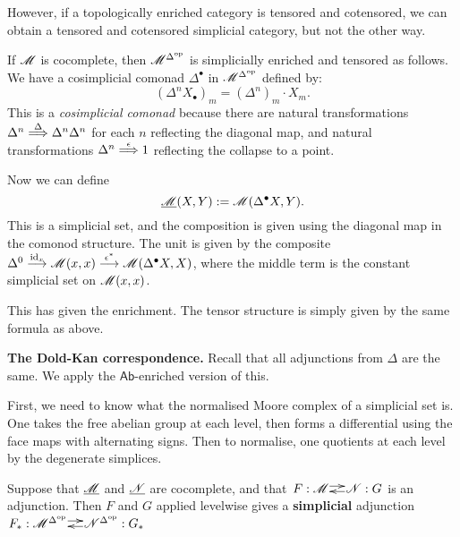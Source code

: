 \documentclass[11pt]{article}
\begin{document}
\begin{4. Basic concepts in enriched category theory}
\begin{itemise}
However, if a topologically enriched category is tensored and cotensored, we can obtain a tensored and cotensored simplicial category, but not the other way.
\item If $\mathscr{M}$ is cocomplete, then $\mathscr{M}^{\Delta^{\textup{op}}}$ is simplicially enriched and tensored as follows. We have a cosimplicial comonad $\Delta^\bullet$ in $\mathscr{M}^{\Delta^{\textup{op}}}$ defined by:
\[(\Delta^nX_\bullet)_m=(\Delta^n)_m\cdot X_m.\]
This is a \emph{cosimplicial comonad} because there are natural transformations $\Delta^n\overset{\Delta}{\Longrightarrow} \Delta^n\Delta^n$ for each $n$ reflecting the diagonal map, and natural transformations $\Delta^n\overset{\epsilon}{\Longrightarrow} 1$ reflecting the collapse to a point.

Now we can define
\[\underline{\mathscr{M}}(X,Y ):=\mathscr{M}(\Delta^\bullet X,Y).\]
This is a simplicial set, and the composition is given using the diagonal map in the comonod structure. The unit is given by the composite $\Delta^0\overset{\textup{id}_x}{\longrightarrow}\mathscr{M}(x,x)\overset{\epsilon^*}{\longrightarrow}\mathscr{M}(\Delta^\bullet X,X)$, where the middle term is the constant simplicial set on $\mathscr{M}(x,x)$.

This has given the enrichment. The tensor structure is simply given by the same formula as above.
\item \textbf{The Dold-Kan correspondence.} 
Recall that all adjunctions from $\Delta$ are the same. We apply the $\mathsf{Ab}$-enriched version of this.

First, we need to know what the normalised Moore complex of a simplicial set is. One takes the free abelian group at each level, then forms a differential using the face maps with alternating signs. Then to normalise, one quotients at each level by the degenerate simplices. 
\item Suppose that $\underline{\mathscr{M}}$ and $\underline{\mathscr{N}}$ are cocomplete, and that 
$\xymatrix@C=.41cm@1{
F:\scrM  \ar@<.6ex>[r]&
\scrN:G  \ar@<.4ex>[l]
}$
 is an adjunction. Then $F$ and $G$ applied levelwise gives a \textbf{simplicial} adjunction $\xymatrix@C=.41cm@1{
F_*:\scrM^{\Delta^{\op}}  \ar@<.6ex>[r]&
\scrN^{\Delta^{\op}}:G_*  \ar@<.4ex>[l]
}$
\end{itemise}
\end{4. Basic concepts in enriched category theory}
\end{document}
